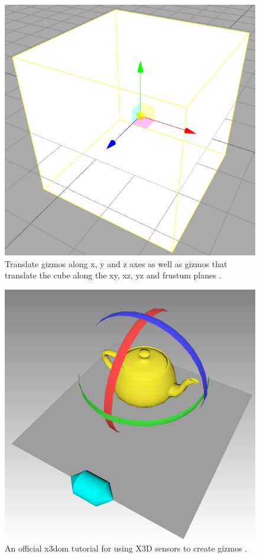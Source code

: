 \begin{figure}[]
  \centering
  \includegraphics[width=12cm]{../assets/threejs-editor.png}
	\caption{ Translate gizmos along x, y and z axes as well as gizmos that translate the cube along the xy, xz, yz and frustum planes \cite{threejseditor}.}
\end{figure}
\begin{figure}[]
  \centering
  \includegraphics[width=12cm]{../assets/x3dom-gizmo-example.png}
	\caption{ An official x3dom tutorial for using X3D sensors to create gizmos \cite{x3dgizmo}. }
	\label{fig:x3dgizmo}
\end{figure}

